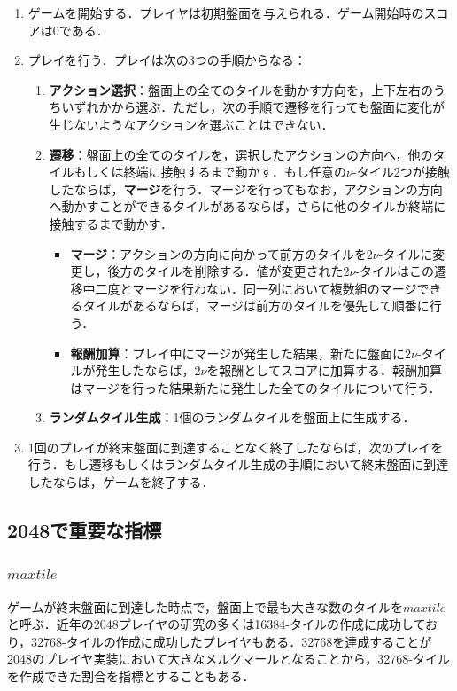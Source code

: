 \documentclass{suribt}
\begin{document}
\begin{enumerate}
\item ゲームを開始する．プレイヤは初期盤面を与えられる．ゲーム開始時のスコアは0である．
\item プレイを行う．プレイは次の3つの手順からなる：
	\begin{enumerate}
	\item \textbf{アクション選択}：盤面上の全てのタイルを動かす方向を，上下左右のうちいずれかから選ぶ．ただし，次の手順で遷移を行っても盤面に変化が生じないようなアクションを選ぶことはできない．
	\item \textbf{遷移}：盤面上の全てのタイルを，選択したアクションの方向へ，他のタイルもしくは終端に接触するまで動かす．もし任意の${\nu}$-タイル2つが接触したならば，\textbf{マージ}を行う．マージを行ってもなお，アクションの方向へ動かすことができるタイルがあるならば，さらに他のタイルか終端に接触するまで動かす．
	\begin{itemize}
		\item \textbf{マージ}：アクションの方向に向かって前方のタイルを$2{\nu}$-タイルに変更し，後方のタイルを削除する．値が変更された$2{\nu}$-タイルはこの遷移中二度とマージを行わない．同一列において複数組のマージできるタイルがあるならば，マージは前方のタイルを優先して順番に行う．
		\item \textbf{報酬加算}：プレイ中にマージが発生した結果，新たに盤面に$2{\nu}$-タイルが発生したならば，$2{\nu}$を報酬としてスコアに加算する．報酬加算はマージを行った結果新たに発生した全てのタイルについて行う．
	\end{itemize}
	\item \textbf{ランダムタイル生成}：1個のランダムタイルを盤面上に生成する．
	\end{enumerate}
\item 1回のプレイが終末盤面に到達することなく終了したならば，次のプレイを行う．もし遷移もしくはランダムタイル生成の手順において終末盤面に到達したならば，ゲームを終了する．
\end{enumerate}

\subsection{2048で重要な指標}
\subsubsection{$max tile$}
ゲームが終末盤面に到達した時点で，盤面上で最も大きな数のタイルを$max tile$と呼ぶ．近年の2048プレイヤの研究の多くは16384-タイルの作成に成功しており，32768-タイルの作成に成功したプレイヤもある．\cite{Jaskowski}32768を達成することが2048のプレイヤ実装において大きなメルクマールとなることから，32768-タイルを作成できた割合を指標とすることもある．\cite{Jaskowski}
\end{document}
